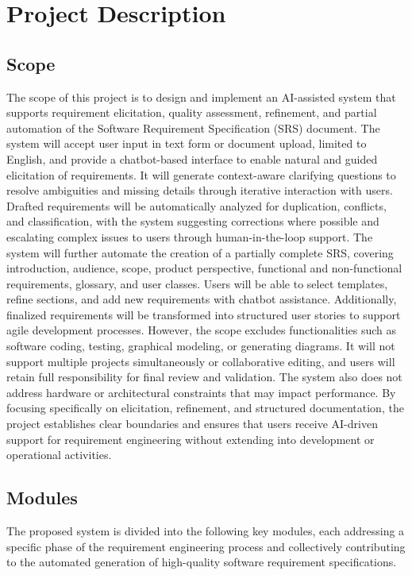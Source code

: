 \chapter{Project Description}
\label{ch:description}
\section{Scope}
\vspace{-1.06cm}
The scope of this project is to design and implement an AI-assisted system that supports requirement elicitation, quality assessment, refinement, and partial automation of the Software Requirement Specification (SRS) document. The system will accept user input in text form or document upload, limited to English, and provide a chatbot-based interface to enable natural and guided elicitation of requirements. It will generate context-aware clarifying questions to resolve ambiguities and missing details through iterative interaction with users. Drafted requirements will be automatically analyzed for duplication, conflicts, and classification, with the system suggesting corrections where possible and escalating complex issues to users through human-in-the-loop support. The system will further automate the creation of a partially complete SRS, covering introduction, audience, scope, product perspective, functional and non-functional requirements, glossary, and user classes. Users will be able to select templates, refine sections, and add new requirements with chatbot assistance. Additionally, finalized requirements will be transformed into structured user stories to support agile development processes. However, the scope excludes functionalities such as software coding, testing, graphical modeling, or generating diagrams. It will not support multiple projects simultaneously or collaborative editing, and users will retain full responsibility for final review and validation. The system also does not address hardware or architectural constraints that may impact performance. By focusing specifically on elicitation, refinement, and structured documentation, the project establishes clear boundaries and ensures that users receive AI-driven support for requirement engineering without extending into development or operational activities.

\section{Modules}
The proposed system is divided into the following key modules, each addressing a specific phase of the requirement engineering process and collectively contributing to the automated generation of high-quality software requirement specifications.

